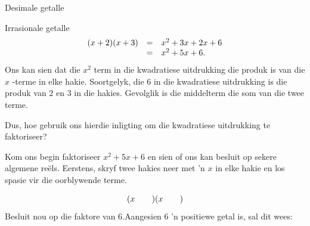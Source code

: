 \begin{Aktiwiteit}{Desimale getalle}
\begin{aktiwiteit}{Irrasionale getalle}
\begin{equation*}
\begin{array}{ccl}\hfill (x+2)(x+3)& =& x^2+3x+2x+6 \\ & =& {x}^{2}+5x+6.\hfill \end{array}
\end{equation*}
Ons kan sien dat die ${x}^{2}$ term in die kwadratiese uitdrukking die produk is van die $x$ -terme in elke hakie. Soortgelyk, die $6$ in die kwadratiese uitdrukking is die produk van $2$ en $3$ in die hakies. Gevolglik is die middelterm die
som van die twee terme.\par 
Dus, hoe gebruik ons hierdie inligting om die kwadratiese uitdrukking te faktoriseer?\par 
Kom ons begin faktoriseer ${x}^{2}+5x+6$ en sien of ons kan besluit op sekere algemene reëls. Eerstens, skryf twee hakies neer met ’n $x$ in elke hakie en los spasie vir die oorblywende terme.\par 
\begin{equation*}
(x\phantom{\rule{2.em}{0ex}})(x\phantom{\rule{2.em}{0ex}})
\end{equation*}
Besluit nou op die faktore van $6$.Aangesien $6$ ’n positiewe getal is, sal dit wees:\par 
\begin{table}[H]
\begin{center}
\label{m39394*id275986}
\noindent


\end{center}
\end{table}
\end{aktiwiteit}
\end{Aktiwiteit}
